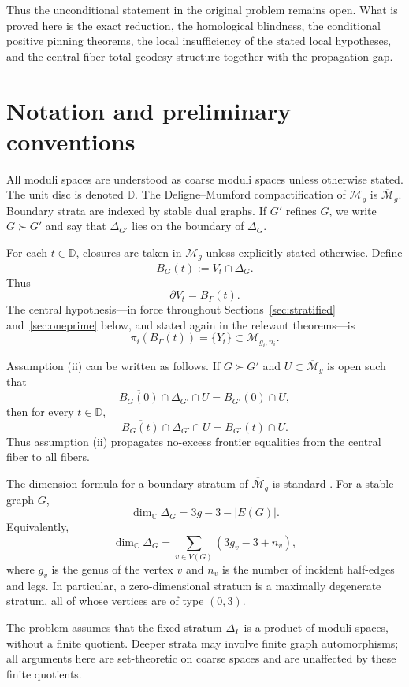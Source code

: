 \documentclass[12pt]{article}
\theoremstyle{plain}
\theoremstyle{definition}
\theoremstyle{remark}
\newcommand{\D}{\mathbb D}
\newcommand{\C}{\mathbb C}
\newcommand{\M}{\mathcal M}
\newcommand{\bMg}{\overline{\M}_g}
\begin{document}
Thus the unconditional statement in the original problem remains open.  What is proved here is the exact reduction, the homological blindness, the conditional positive pinning theorems, the local insufficiency of the stated local hypotheses, and the central-fiber total-geodesy structure together with the propagation gap.

\section{Notation and preliminary conventions}

All moduli spaces are understood as coarse moduli spaces unless otherwise stated.  The unit disc is denoted \(\D\).  The Deligne--Mumford compactification of \(\M_g\) is \(\bMg\).  Boundary strata are indexed by stable dual graphs.  If \(G'\) refines \(G\), we write \(G\succ G'\) and say that \(\Delta_{G'}\) lies on the boundary of \(\Delta_G\).

For each \(t\in \D\), closures are taken in \(\bMg\) unless explicitly stated otherwise.  Define
\[
B_G(t):=\overline{V_t}\cap \Delta_G .
\]
Thus
\[
\partial V_t=B_\Gamma(t).
\]
The central hypothesis---in force throughout Sections~\ref{sec:stratified} and~\ref{sec:oneprime} below, and stated again in the relevant theorems---is
\[
\pi_i(B_\Gamma(t))=\{Y_t\}\subset \M_{g_i,n_i}.
\]

Assumption (ii) can be written as follows.  If \(G\succ G'\) and \(U\subset \bMg\) is open such that
\[
\overline{B_G(0)}\cap \Delta_{G'}\cap U
=
B_{G'}(0)\cap U,
\]
then for every \(t\in \D\),
\[
\overline{B_G(t)}\cap \Delta_{G'}\cap U
=
B_{G'}(t)\cap U.
\]
Thus assumption (ii) propagates no-excess frontier equalities from the central fiber to all fibers.

The dimension formula for a boundary stratum of \(\bMg\) is standard \cite{DM69,Knu83}.  For a stable graph \(G\),
\[
\dim_\C \Delta_G = 3g-3-|E(G)|.
\]
Equivalently,
\[
\dim_\C \Delta_G=\sum_{v\in V(G)}(3g_v-3+n_v),
\]
where \(g_v\) is the genus of the vertex \(v\) and \(n_v\) is the number of incident half-edges and legs.  In particular, a zero-dimensional stratum is a maximally degenerate stratum, all of whose vertices are of type \((0,3)\).

The problem assumes that the fixed stratum \(\Delta_\Gamma\) is a product of moduli spaces, without a finite quotient.  Deeper strata may involve finite graph automorphisms; all arguments here are set-theoretic on coarse spaces and are unaffected by these finite quotients.
\end{document}

